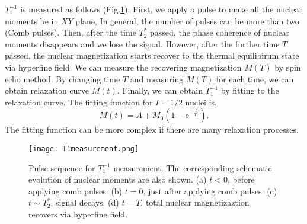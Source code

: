\documentclass[a4,10.5pt]{report}
\begin{document}
$T^{-1}_1$ is measured as follows (Fig.\ref{T1measurement}). 
First, we apply a pulse to make all the nuclear moments be in $XY$ plane,
In general, the number of pulses can be more than two (Comb pulses).
Then, after the time $T^*_2$ passed, the phase coherence of nuclear moments disappears and we lose the signal.
However, after the further time $T$ passed, the nuclear magnetization starts recover to the thermal equilibirum state via hyperfine field.
We can measure the recovering magnetization $M(T)$ by spin echo method.
By changing time $T$ and measuring $M(T)$ for each time, we can obtain relaxation curve $M(t)$.
Finally, we can obtain $T^{-1}_1$ by fitting to the relaxation curve.
The fitting function for $I = 1/2$ nuclei is,
\begin{equation}
M (t) = A + M_0 (1 - \mathrm{e}^{-\frac{t}{T_1}}).
\end{equation}
The fitting function can be more complex if there are many relaxation processes.

\begin{figure}
  \centering
  \texttt{[image: T1measurement.png]}
  \caption{Pulse sequence for $T^{-1}_1$ measurement.
  The corresponding schematic evolution of nuclear moments are also shown.
  (a) $t < 0$, before applying comb pulses.
  (b) $t = 0$, just after applying comb pulses.
  (c) $t\sim T^*_2$, signal decays.
  (d) $t = T$, total nuclear magnetizaztion recovers via hyperfine field.}
  \label{T1measurement}
\end{figure}
\end{document}
